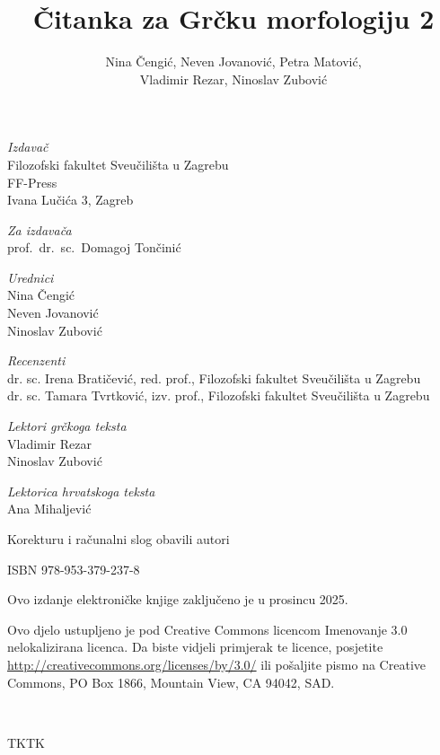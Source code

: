 \documentclass[a4paper,12pt,twoside]{report}
\def\secondpage{\clearpage\null\vfill
\pagestyle{empty}
\begin{minipage}[b]{0.9\textwidth}
\begin{center}
\textit{Izdavač}\\
Filozofski fakultet Sveučilišta u Zagrebu\\
FF-Press\\
Ivana Lučića 3, Zagreb

\bigskip

\textit{Za izdavača}\\
prof.\ dr.\ sc.\ Domagoj Tončinić

\bigskip

\textit{Urednici}\\
Nina Čengić\\
Neven Jovanović\\
Ninoslav Zubović

\bigskip

\textit{Recenzenti}\\
dr. sc. Irena Bratičević, red. prof., Filozofski fakultet Sveučilišta u Zagrebu\\
dr. sc. Tamara Tvrtković, izv. prof., Filozofski fakultet Sveučilišta u Zagrebu

\bigskip

\textit{Lektori grčkoga teksta}\\
Vladimir Rezar\\
Ninoslav Zubović

\textit{Lektorica hrvatskoga teksta}\\
Ana Mihaljević

\bigskip

Korekturu i računalni slog obavili autori

\bigskip

ISBN 978-953-379-237-8

\bigskip

Ovo izdanje elektroničke knjige zaključeno je u prosincu 2025.




\end{center}
\footnotesize\raggedright
\setlength{\parskip}{0.5\baselineskip}
\noindent Ovo djelo ustupljeno je pod Creative Commons licencom Imenovanje 3.0 nelokalizirana licenca. Da biste vidjeli primjerak te licence, posjetite \url{http://creativecommons.org/licenses/by/3.0/} ili pošaljite pismo na Creative Commons, PO Box 1866, Mountain View, CA 94042, SAD. 

\end{minipage}
\vspace*{3\baselineskip}
}
\begin{document}
\title{Čitanka za Grčku morfologiju 2}
\author{Nina Čengić, Neven Jovanović, Petra Matović, \\Vladimir Rezar, Ninoslav Zubović}
\date{}
\secondpage

\newpage

\thispagestyle{empty}

\ %

\newpage

TKTK
\end{document}
